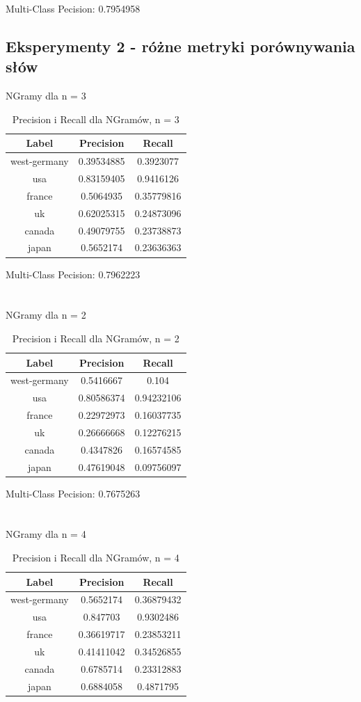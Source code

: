 \documentclass{classrep}
\begin{document}
Multi-Class Pecision: 0.7954958
\newpage

\subsection{Eksperymenty 2 - różne metryki porównywania słów}
NGramy dla n = 3
\begin{table}[H]
\begin{tabular}{|c|c|c|}
\hline
Label        & Precision  & Recall     \\ \hline
west-germany & 0.39534885 & 0.3923077  \\ \hline
usa          & 0.83159405 & 0.9416126  \\ \hline
france       & 0.5064935  & 0.35779816 \\ \hline
uk           & 0.62025315 & 0.24873096 \\ \hline
canada       & 0.49079755 & 0.23738873 \\ \hline
japan        & 0.5652174  & 0.23636363 \\ \hline
\end{tabular}
\caption{Precision i Recall dla NGramów, n = 3}
\end{table}
Multi-Class Pecision: 0.7962223\\
\\
\\
NGramy dla n = 2
\begin{table}[H]
\begin{tabular}{|c|c|c|}
\hline
Label        & Precision  & Recall     \\ \hline
west-germany & 0.5416667  & 0.104      \\ \hline
usa          & 0.80586374 & 0.94232106 \\ \hline
france       & 0.22972973 & 0.16037735 \\ \hline
uk           & 0.26666668 & 0.12276215 \\ \hline
canada       & 0.4347826  & 0.16574585 \\ \hline
japan        & 0.47619048 & 0.09756097 \\ \hline
\end{tabular}
\caption{Precision i Recall dla NGramów, n = 2}
\end{table}
Multi-Class Pecision: 0.7675263\\
\\
\\
NGramy dla n = 4
\begin{table}[H]
\begin{tabular}{|c|c|c|}
\hline
Label        & Precision  & Recall     \\ \hline
west-germany & 0.5652174  & 0.36879432 \\ \hline
usa          & 0.847703   & 0.9302486  \\ \hline
france       & 0.36619717 & 0.23853211 \\ \hline
uk           & 0.41411042 & 0.34526855 \\ \hline
canada       & 0.6785714  & 0.23312883 \\ \hline
japan        & 0.6884058  & 0.4871795  \\ \hline
\end{tabular}
\caption{Precision i Recall dla NGramów, n = 4}
\end{table}
\end{document}
